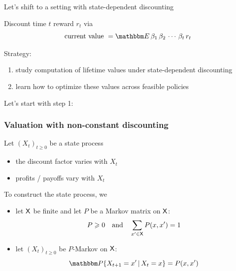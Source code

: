 \documentclass[xcolor=tex,dvipsnames]{beamer}
\begin{document}
\begin{frame}
    
    Let's shift to a setting with state-dependent discounting

    \vspace{0.4em}
    \Eg Discount time $t$ reward $r_t$ via
    \begin{equation*}
        \text{current value } = \EE \, \beta_1 \, \beta_2 \, \cdots  \,\beta_t \, r_t
    \end{equation*}

    \vspace{0.4em}
    \vspace{0.4em}
    \vspace{0.4em}

    Strategy:
    \begin{enumerate}
        \item study computation of lifetime values under state-dependent
            discounting
        \vspace{0.4em}
        \item learn how to optimize these values across feasible policies
        \vspace{0.4em}
    \end{enumerate}


    Let's start with step 1:

\end{frame}



\begin{frame}
    \frametitle{Valuation with non-constant discounting}

    Let $(X_t)_{t \geq 0}$ be a state process 
    \begin{itemize}
        \item the discount factor varies with $X_t$
        \vspace{0.4em}
        \item profits / payoffs vary with $X_t$
    \end{itemize}

        \vspace{0.4em}
        \vspace{0.4em}

    To construct the state process, we
    \begin{itemize}
        \item let $\mathsf X$ be finite and let $P$ be a Markov matrix on $\mathsf X$:
            \begin{equation*}
                P \geqslant 0
                \quad \text{and} \quad
                \sum_{x' \in \mathsf X} P(x, x') = 1
            \end{equation*}
        \item let $(X_t)_{t \geq 0}$ be $P$-Markov on $\mathsf X$:
        \begin{equation*}
            \PP\{X_{t+1} = x' \given X_t = x\}
            = P(x, x')
        \end{equation*}
    \end{itemize}


\end{frame}
\end{document}
